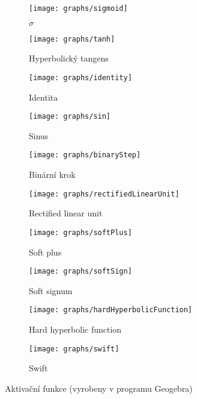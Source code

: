 \documentclass[12pt]{report}			%
\begin{document}
\begin{itemize}
				\begin{figure}
				    \centering
				    \begin{subfigure}[b]{0.3\textwidth}
				        \texttt{[image: graphs/sigmoid]}
				        \caption{$\sigma$}
				    \end{subfigure}
				    \begin{subfigure}[b]{0.3\textwidth}
				        \texttt{[image: graphs/tanh]}
				        \caption{Hyperbolický tangens}
				    \end{subfigure}
				    \begin{subfigure}[b]{0.3\textwidth}
				        \texttt{[image: graphs/identity]}
				        \caption{Identita}
				    \end{subfigure}
				    \begin{subfigure}[b]{0.3\textwidth}
				        \texttt{[image: graphs/sin]}
				        \caption{Sinus}
				    \end{subfigure}
				    \begin{subfigure}[b]{0.3\textwidth}
				        \texttt{[image: graphs/binaryStep]}
				        \caption{Binární krok}
				    \end{subfigure}
				    \begin{subfigure}[b]{0.3\textwidth}
				        \texttt{[image: graphs/rectifiedLinearUnit]}
				        \caption{Rectified linear unit}
				    \end{subfigure}
				    \begin{subfigure}[b]{0.3\textwidth}
				        \texttt{[image: graphs/softPlus]}
				        \caption{Soft plus}
				    \end{subfigure}
				    \begin{subfigure}[b]{0.3\textwidth}
				        \texttt{[image: graphs/softSign]}
				        \caption{Soft signum}
				    \end{subfigure}
				    \begin{subfigure}[b]{0.3\textwidth}
				        \texttt{[image: graphs/hardHyperbolicFunction]}
				        \caption{Hard hyperbolic function}
				    \end{subfigure}
				    \begin{subfigure}[b]{0.3\textwidth}
				        \texttt{[image: graphs/swift]}
				        \caption{Swift}
				    \end{subfigure}
				    \caption{Aktivační funkce (vyrobeny v programu Geogebra)}
				\end{figure}
						
				\end{itemize}
				
\end{document}
